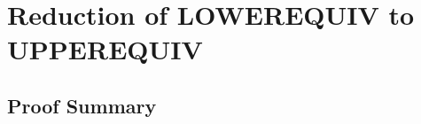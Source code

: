 \documentclass{article}
\begin{document}

\section{Reduction of LOWEREQUIV to UPPEREQUIV}

\subsection{Proof Summary}









\end{document}
